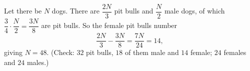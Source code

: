 Let there be $N$ dogs. There are $\dfrac{2N}{3}$ pit bulls and $\dfrac {N}{2}$ male dogs, of which $\dfrac{3}{4}\cdot\dfrac {N}{2}=\dfrac{3N}{8}$ are pit bulls. So the female pit bulls number
\[
\dfrac{2N}{3}-\dfrac{3N}{8}=\dfrac{7N}{24}=14,
\]
giving $N=\boxed{48}$. (Check: $32$ pit bulls, $18$ of them male and $14$ female; $24$ females and $24$ males.)
